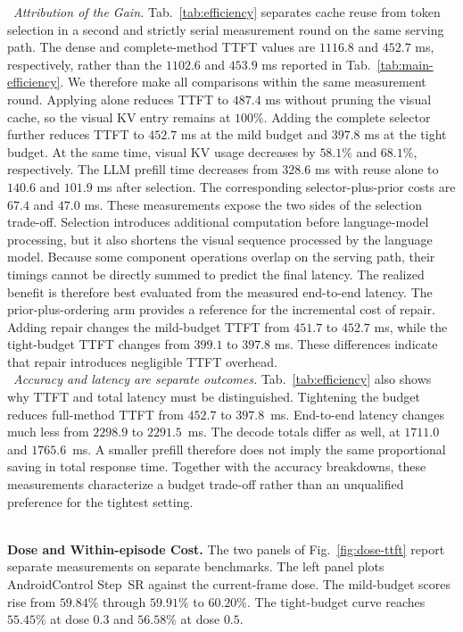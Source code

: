 \noindent{}~\textit{Attribution of the Gain.}
%
Tab.~\ref{tab:efficiency} separates cache reuse from token selection in a second and strictly serial measurement round on the same serving path.
%
The dense and complete-method TTFT values are $1116.8$ and $452.7$ ms, respectively, rather than the $1102.6$ and $453.9$ ms reported in Tab.~\ref{tab:main-efficiency}. We therefore make all comparisons within the same measurement round.
%
Applying \kvr{} alone reduces TTFT to $487.4$ ms without pruning the visual cache, so the visual KV entry remains at $100\%$. Adding the complete selector further reduces TTFT to $452.7$ ms at the mild budget and $397.8$ ms at the tight budget. At the same time, visual KV usage decreases by $58.1\%$ and $68.1\%$, respectively.
%
The LLM prefill time decreases from $328.6$ ms with reuse alone to $140.6$ and $101.9$ ms after selection. The corresponding selector-plus-prior costs are $67.4$ and $47.0$ ms. These measurements expose the two sides of the selection trade-off. Selection introduces additional computation before language-model processing, but it also shortens the visual sequence processed by the language model. Because some component operations overlap on the serving path, their timings cannot be directly summed to predict the final latency. The realized benefit is therefore best evaluated from the measured end-to-end latency.
%
The prior-plus-ordering arm provides a reference for the incremental cost of repair.
%
Adding repair changes the mild-budget TTFT from $451.7$ to $452.7$ ms, while the tight-budget TTFT changes from $399.1$ to $397.8$ ms. 
%
These differences indicate that repair introduces negligible TTFT overhead.
\\
\noindent{}~\textit{Accuracy and latency are separate outcomes.}
Tab.~\ref{tab:efficiency} also shows why TTFT and total latency must be distinguished. Tightening the budget reduces full-method TTFT from $452.7$ to $397.8$\ ms. End-to-end latency changes much less from $2298.9$ to $2291.5$\ ms.
%
The decode totals differ as well, at $1711.0$ and $1765.6$\ ms. A smaller prefill therefore does not imply the same proportional saving in total response time.
%
Together with the accuracy breakdowns, these measurements characterize a budget trade-off rather than an unqualified preference for the tightest setting.

\\
\noindent\textbf{Dose and Within-episode Cost.}
The two panels of Fig.~\ref{fig:dose-ttft} report separate measurements on separate benchmarks.
%
The left panel plots AndroidControl Step~SR against the current-frame dose. The mild-budget scores rise from $59.84\%$ through $59.91\%$ to $60.20\%$. The tight-budget curve reaches $55.45\%$ at dose $0.3$ and $56.58\%$ at dose $0.5$.
